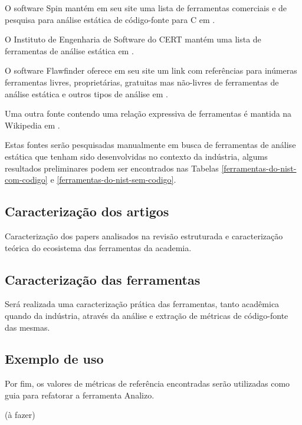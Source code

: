\documentclass[12pt]{article}
\begin{document}
O software Spin mantém em seu site uma lista de ferramentas comerciais e de
pesquisa para análise estática de código-fonte para C em
.

O Instituto de Engenharia de Software do CERT mantém uma lista de ferramentas
de análise estática em .

O software Flawfinder oferece em seu site um link com referências para
inúmeras ferramentas livres, proprietárias, gratuitas mas não-livres de
ferramentas de análise estática e outros tipos de análise em
.

Uma outra fonte contendo uma relação expressiva de ferramentas é mantida na
Wikipedia em .

Estas fontes serão pesquisadas manualmente em busca de ferramentas de análise
estática que tenham sido desenvolvidas no contexto da indústria, algums
resultados preliminares podem ser encontrados nas Tabelas
\ref{ferramentas-do-nist-com-codigo} e \ref{ferramentas-do-nist-sem-codigo}.

\subsection{Caracterização dos artigos}

Caracterização dos papers analisados na revisão estruturada e caracterização
teórica do ecosistema das ferramentas da academia.

\subsection{Caracterização das ferramentas}

Será realizada uma caracterização prática das ferramentas, tanto acadêmica
quando da indústria, através da análise e extração de métricas de código-fonte
das mesmas.


\subsection{Exemplo de uso}

Por fim, os valores de métricas de referência encontradas serão utilizadas
como guia para refatorar a ferramenta Analizo.

(à fazer)
\end{document}
